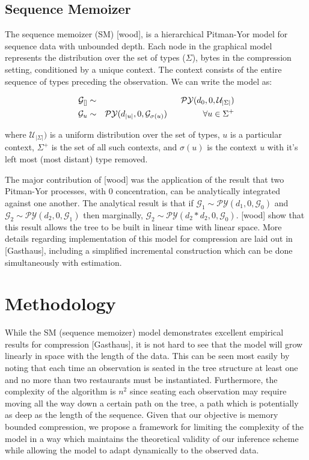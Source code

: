 \documentclass{article}
\newcommand{\PY}{\mathcal{P}\mathcal{Y}}
\newcommand{\G}{\mathcal{G}}
\begin{document}
\subsection{Sequence Memoizer}

The sequence memoizer (SM) [wood], is a hierarchical Pitman-Yor model for sequence data with unbounded depth.  Each node in the graphical model represents the distribution over the set of types ($\Sigma$), bytes in the compression setting, conditioned by a unique context.  The context consists of the entire sequence of types preceding the observation.  We can write the model as:

\begin{eqnarray*}
	\G_{[]} &\sim& \PY(d_0, 0, \mathcal{U}_{| \Sigma |}) \\
	\G_{u} &\sim& \PY(d_{|u|}, 0, \G_{\sigma(u)}) \hspace{1.5cm} \forall u \in \Sigma^+
\end{eqnarray*}

where $\mathcal{U}_{| \Sigma |})$ is a uniform distribution over the set of types, $u$ is a particular context, $\Sigma^+$ is the set of all such contexts, and $\sigma(u)$ is the context $u$ with it's left most (most distant) type removed.

The major contribution of [wood] was the application of the result that two Pitman-Yor processes, with 0 concentration, can be analytically integrated against one another.  The analytical result is that if $\G_1 \sim \PY(d_1, 0, \G_0)$ and $\G_2 \sim \PY(d_2, 0, \G_1)$ then marginally, $\G_2 \sim \PY(d_2*d_2, 0, \G_0)$.  [wood] show that this result allows the tree to be built in linear time with linear space.  More details regarding implementation of this model for compression are laid out in [Gasthaus], including a simplified incremental construction which can be done simultaneously with estimation.

\section{Methodology}

While the SM (sequence memoizer) model demonstrates excellent empirical results for compression [Gasthaus], it is not hard to see that the model will grow linearly in space with the length of the data.  This can be seen most easily by noting that each time an observation is seated in the tree structure at least one and no more than two restaurants must be instantiated.  Furthermore, the complexity of the algorithm is $n^2$ since seating each observation may require moving all the way down a certain path on the tree, a path which is potentially as deep as the length of the sequence.  Given that our objective is memory bounded compression, we propose a framework for limiting the complexity of the model in a way which maintains the theoretical validity of our inference scheme while allowing the model to adapt dynamically to the observed data.
\end{document}
